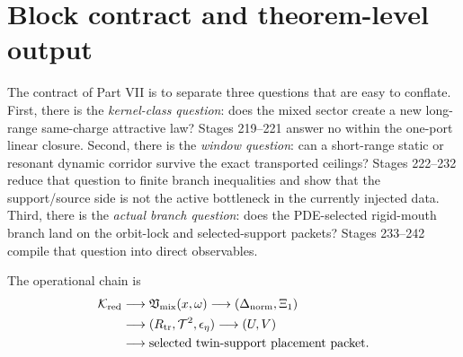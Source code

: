 \section{Block contract and theorem-level output}
\label{sec:app-part07-block-contract}

The contract of Part VII is to separate three questions that are easy to conflate.  First, there is the \emph{kernel-class question}: does the mixed sector create a new long-range same-charge attractive law?  Stages 219--221 answer no within the one-port linear closure.  Second, there is the \emph{window question}: can a short-range static or resonant dynamic corridor survive the exact transported ceilings?  Stages 222--232 reduce that question to finite branch inequalities and show that the support/source side is not the active bottleneck in the currently injected data.  Third, there is the \emph{actual branch question}: does the PDE-selected rigid-mouth branch land on the orbit-lock and selected-support packets?  Stages 233--242 compile that question into direct observables.

The operational chain is
\begin{equation}
\label{eq:app-part07-operational-chain}
\begin{aligned}
\mathcal K_{\rm red}
&\longrightarrow
\mathfrak V_{\rm mix}(x,\omega)
\longrightarrow
(\Delta_{\rm norm},\Xi_1)
\\
&\longrightarrow
(R_{\rm tr},\mathcal T^2,\epsilon_\eta)
\longrightarrow
(U,V)
\\
&\longrightarrow
\text{selected twin-support placement packet}.
\end{aligned}
\end{equation}

